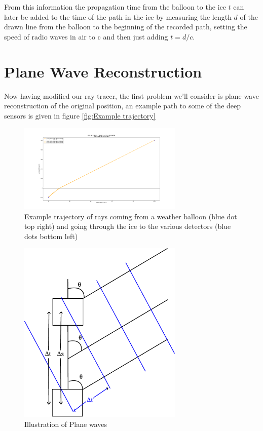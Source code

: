 \documentclass[11pt,a4paper,faculty=we,language=en,doctype=report]{cls/ugent-doc}
\begin{document}
From this information the propagation time from the balloon to the ice $t$ 
can later be added to the time of the path in the ice by measuring the 
length $d$ of the drawn line from the balloon to the beginning of the recorded path, 
setting the speed of radio waves in air to c and then just adding $t = d/c$.
\section{Plane Wave Reconstruction}
Now having modified our ray tracer, the first problem we'll consider is
plane wave reconstruction of the original position, an example path
to some of the deep sensors is given in figure \ref{fig:Example
trajectory}
\begin{figure}
	\centering
	\includegraphics[width=0.7\textwidth]{weerballontraject.pdf}
	\caption{Example trajectory of rays coming from a weather balloon (blue dot top right) and going through the ice to the various detectors (blue dots bottom left)}
	\label{fig:Example trajectory}
\end{figure}
\begin{figure}
	\centering
	\includegraphics[width=0.7\textwidth]{planewave.pdf}
	\caption{Illustration of Plane waves}	
	\label{fig:Plane Wave}
\end{figure}
\end{document}
